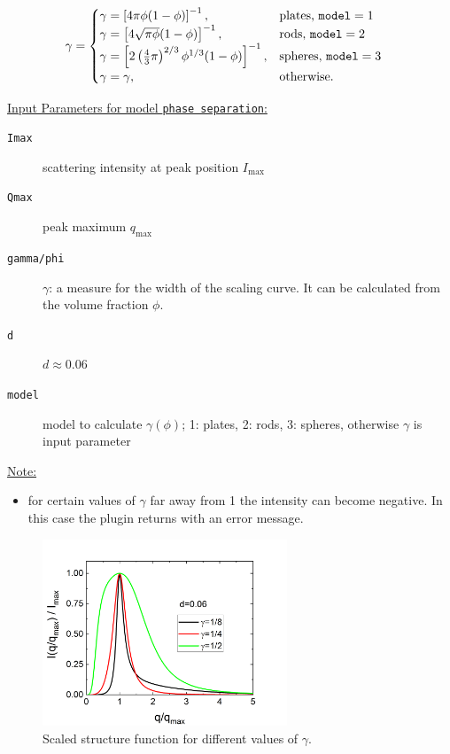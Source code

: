 \begin{align}\label{eq:gamma_phi}
  \gamma &=
  \begin{cases}
    \gamma=\left[4\pi\phi(1-\phi)\right]^{-1}, & \mbox{plates, \texttt{model}}=1 \\
    \gamma=\left[4\sqrt{\pi\phi}(1-\phi)\right]^{-1}, & \mbox{rods, \texttt{model}}=2 \\
    \gamma=\left[2\left(\frac43\pi\right)^{2/3}\phi^{1/3}(1-\phi)\right]^{-1}, & \mbox{spheres, \texttt{model}}=3 \\
    \gamma=\gamma, & \mbox{otherwise}.
  \end{cases}
\end{align}

\vspace{5mm}

\uline{Input Parameters for model \texttt{phase separation}:}\\
\begin{description}
\item[\texttt{Imax}] scattering intensity at peak position $I_\text{max}$
\item[\texttt{Qmax}] peak maximum $q_\text{max}$
\item[\texttt{gamma/phi}] $\gamma$: a measure for the width of the scaling curve. It can be calculated from the volume fraction $\phi$.
\item[\texttt{d}] $d \approx 0.06$
\item[\texttt{model}] model to calculate $\gamma(\phi)$; 1: plates, 2: rods, 3: spheres, otherwise $\gamma$ is input parameter
\end{description}

\uline{Note:}
\begin{itemize}
\item for certain values of $\gamma$ far away from 1 the intensity can become negative. In this case the plugin returns with an error message.
\end{itemize}



\begin{figure}[htb]
\begin{center}
\includegraphics[width=0.65\textwidth]{../images/form_factor/nonparticular/phase_separation.png}
\end{center}
\caption{Scaled structure function for different values of $\gamma$.} \label{fig:phaseseparationIQ}
\end{figure}

